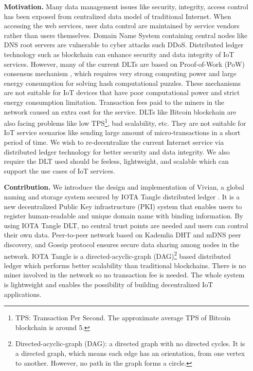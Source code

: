 \begin{onehalfspace}
\end{onehalfspace}
\noindent\textbf{Motivation.} Many data management issues like security, integrity, access control has been exposed from centralized data model of traditional Internet. 
When accessing the web services, user data control are maintained by service vendors rather than users themselves.
Domain Name System containing central nodes like DNS root servers are vulnerable to cyber attacks such DDoS. 
Distributed ledger technology such as blockchain can enhance security and data integrity of IoT services. 
However, many of the current DLTs are based on Proof-of-Work (PoW) consensus mechanism \cite{10.1145/2976749.2978341}, which requires very strong computing power and large energy consumption for solving hash computational puzzles.
These mechanisms are not suitable for IoT devices that have poor computational power and strict energy consumption limitation. Transaction fees paid to the miners in the network caused an extra cost for the service. 
DLTs like Bitcoin blockchain are also facing problems like low TPS\footnote{TPS: Transaction Per Second. The approximate average TPS of Bitcoin blockchain is around 5.}, bad scalability, etc.
They are not suitable for IoT service scenarios like sending large amount of micro-transactions in a short period of time. We wish to re-decentralize the current Internet service via distributed ledger technology for better security and data integrity.
We also require the DLT used should be feeless, lightweight, and scalable which can support the use cases of IoT services.


\begin{onehalfspace}
\end{onehalfspace}
\noindent\textbf{Contribution.} We introduce the design and implementation of Vivian, a global naming and storage system secured by IOTA Tangle distributed ledger \cite{popov2018tangle}. 
It is a new decentralized Public Key infrastructure (PKI) system that enables users to register human-readable and unique domain name with binding information. 
By using IOTA Tangle DLT, no central trust points are needed and users can control their own data. 
Peer-to-peer network based on Kademlia DHT and mDNS peer discovery, and Gossip protocol ensures secure data sharing among nodes in the network.
IOTA Tangle is a directed-acyclic-graph (DAG)\footnote{Directed-acyclic-graph (DAG): a directed graph with no directed cycles. It is a directed graph, which means each edge has an orientation, from one vertex to another. However, no path in the graph forms a circle.} based distributed ledger which performs better scalability than traditional blockchains. There is no miner involved in the network so no transaction fee is needed.
The whole system is lightweight and enables the possibility of building decentralized IoT applications.